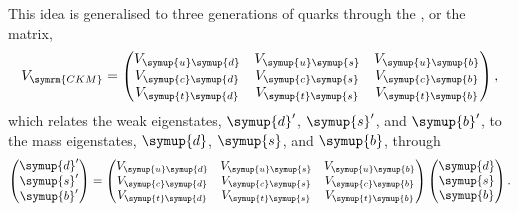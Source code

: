 \documentclass[fleqn]{NotesClass}
\newcommand{\Pparticle}[1]{\symup{#1}}
\newcommand{\Pu}{\ensuremath{\Pparticle{u}}}
\newcommand{\Pd}{\ensuremath{\Pparticle{d}}}
\newcommand{\Ps}{\ensuremath{\Pparticle{s}}}
\newcommand{\Pc}{\ensuremath{\Pparticle{c}}}
\newcommand{\Pt}{\ensuremath{\Pparticle{t}}}
\newcommand{\Pb}{\ensuremath{\Pparticle{b}}}
\begin{document}
    This idea is generalised to three generations of quarks through the , or the  matrix,
    \begin{equation}
        V_{\symrm{CKM}} = 
        \begin{pmatrix}
            V_{\Pu\Pd} & V_{\Pu\Ps} & V_{\Pu\Pb} \\
            V_{\Pc\Pd} & V_{\Pc\Ps} & V_{\Pc\Pb} \\
            V_{\Pt\Pd} & V_{\Pt\Ps} & V_{\Pt\Pb}
        \end{pmatrix}
        ,
    \end{equation}
    which relates the weak eigenstates, \(\Pd'\), \(\Ps'\), and \(\Pb'\), to the mass eigenstates, \(\Pd\), \(\Ps\), and \(\Pb\), through
    \begin{equation}
        \begin{pmatrix}
            \Pd'\\ \Ps'\\ \Pb'
        \end{pmatrix}
        =
        \begin{pmatrix}
            V_{\Pu\Pd} & V_{\Pu\Ps} & V_{\Pu\Pb} \\
            V_{\Pc\Pd} & V_{\Pc\Ps} & V_{\Pc\Pb} \\
            V_{\Pt\Pd} & V_{\Pt\Ps} & V_{\Pt\Pb}
        \end{pmatrix}
        \begin{pmatrix}
            \Pd\\ \Ps\\ \Pb
        \end{pmatrix}
        .
    \end{equation}
    
\end{document}
